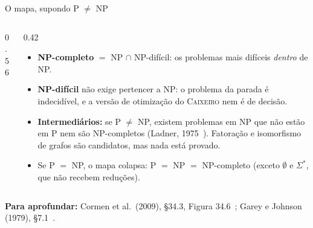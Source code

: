 \documentclass[aspectratio=169,xcolor=table]{beamer}
\newcommand{\fonte}[1]{%
  \vfill
  {\tiny\color{gray!55!black}\textbf{Para aprofundar:} #1\par}%
}
\newcommand{\prob}[1]{\textsc{#1}}
\begin{document}
\begin{frame}{O mapa, supondo P $\ne$ NP}
\begin{columns}[c]
\begin{column}{0.56\textwidth}
{}
    \end{column}
    \begin{column}{0.42\textwidth}
      \scriptsize
      \begin{itemize}
        \item \textbf{NP-completo} $=$ NP $\cap$ NP-difícil: os problemas mais difíceis
              \emph{dentro} de NP.
        \item \textbf{NP-difícil} não exige pertencer a NP: o problema da parada é
              indecidível, e a versão de otimização do \prob{Caixeiro} nem é de decisão.
        \item \textbf{Intermediários:} se P $\ne$ NP, existem problemas em NP que não estão em P
              nem são NP-completos (Ladner, 1975~\cite{ladner1975structure}). Fatoração e
              isomorfismo de grafos são candidatos, mas nada está provado.
        \item Se P $=$ NP, o mapa colapsa: P $=$ NP $=$ NP-completo (exceto $\emptyset$ e
              $\Sigma^*$, que não recebem reduções).
      \end{itemize}
    \end{column}
  \end{columns}
  \fonte{Cormen et al.\ (2009), \S 34.3, Figura 34.6~\cite{cormen2009introduction};
    Garey e Johnson (1979), \S 7.1~\cite{garey1979computers}.}
\end{frame}
\end{document}
